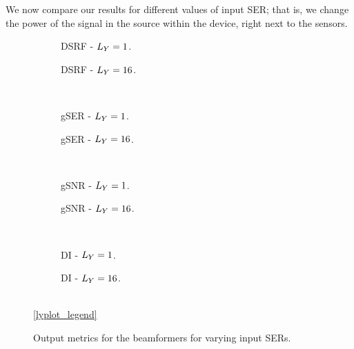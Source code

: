 We now compare our results for different values of input SER; that is, we change the power of the signal in the source within the device, right next to the sensors.
\begin{figure}[!ht]
	\centering
	\begin{subfigure}{0.49\textwidth}
		\centering
		
		\caption{DSRF - $\Ly = 1$.}
		\label{subfig:lineplot__DSRF__iSER_var__Ly_1}
	\end{subfigure}\hfill
	\begin{subfigure}{0.49\textwidth}
		\centering
		
		\caption{DSRF - $\Ly = 16$.}
		\label{subfig:lineplot__DSRF__iSER_var__Ly_16}
	\end{subfigure}\\[1em]
	\begin{subfigure}{0.49\textwidth}
		\centering
		
		\caption{gSER - $\Ly = 1$.}
		\label{subfig:lineplot__gSER__iSER_var__Ly_1}
	\end{subfigure}\hfill
	\begin{subfigure}{0.49\textwidth}
		\centering
		
		\caption{gSER - $\Ly = 16$.}
		\label{subfig:lineplot__gSER__iSER_var__Ly_16}
	\end{subfigure}\\[1em]
	\begin{subfigure}{0.49\textwidth}
		\centering
		
		\caption{gSNR - $\Ly = 1$.}
		\label{subfig:lineplot__gSNR__iSER_var__Ly_1}
	\end{subfigure}\hfill
	\begin{subfigure}{0.49\textwidth}
		\centering
		
		\caption{gSNR - $\Ly = 16$.}
		\label{subfig:lineplot__gSNR__iSER_var__Ly_16}
	\end{subfigure}\\[1em]
	\begin{subfigure}{0.49\textwidth}
		\centering
		
		\caption{DI - $\Ly = 1$.}
		\label{subfig:lineplot__DI__iSER_var__Ly_1}
	\end{subfigure}\hfill
	\begin{subfigure}{0.49\textwidth}
		\centering
		
		\caption{DI - $\Ly = 16$.}
		\label{subfig:lineplot__DI__iSER_var__Ly_16}
	\end{subfigure}\\[1em]
	\ref*{lyplot_legend}
	\caption{Output metrics for the beamformers for varying input SERs.}
	\label{fig:lineplot__iSER_var__Ly_1}
\end{figure}

